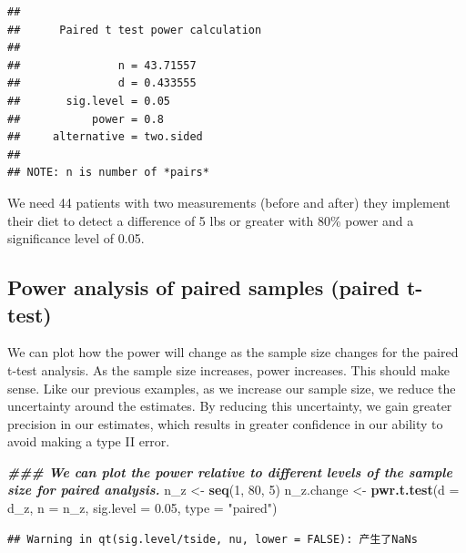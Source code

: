 \documentclass[
]{book}
\newenvironment{Shaded}{\begin{snugshade}}{\end{snugshade}}
\newcommand{\AttributeTok}[1]{\textcolor[rgb]{0.13,0.29,0.53}{#1}}
\newcommand{\DecValTok}[1]{\textcolor[rgb]{0.00,0.00,0.81}{#1}}
\newcommand{\DocumentationTok}[1]{\textcolor[rgb]{0.56,0.35,0.01}{\textbf{\textit{#1}}}}
\newcommand{\FloatTok}[1]{\textcolor[rgb]{0.00,0.00,0.81}{#1}}
\newcommand{\FunctionTok}[1]{\textcolor[rgb]{0.13,0.29,0.53}{\textbf{#1}}}
\newcommand{\NormalTok}[1]{#1}
\newcommand{\OtherTok}[1]{\textcolor[rgb]{0.56,0.35,0.01}{#1}}
\newcommand{\SpecialCharTok}[1]{\textcolor[rgb]{0.81,0.36,0.00}{\textbf{#1}}}
\newcommand{\StringTok}[1]{\textcolor[rgb]{0.31,0.60,0.02}{#1}}
\begin{document}
\begin{verbatim}
## 
##      Paired t test power calculation 
## 
##               n = 43.71557
##               d = 0.433555
##       sig.level = 0.05
##           power = 0.8
##     alternative = two.sided
## 
## NOTE: n is number of *pairs*
\end{verbatim}

We need 44 patients with two measurements (before and after) they implement their diet to detect a difference of 5 lbs or greater with 80\% power and a significance level of 0.05.

\hypertarget{power-analysis-of-paired-samples-paired-t-test}{%
\subsection{\texorpdfstring{Power analysis of \textbf{paired samples (paired t-test)}}{Power analysis of paired samples (paired t-test)}}\label{power-analysis-of-paired-samples-paired-t-test}}

We can plot how the power will change as the sample size changes for the paired t-test analysis. As the sample size increases, power increases. This should make sense. Like our previous examples, as we increase our sample size, we reduce the uncertainty around the estimates. By reducing this uncertainty, we gain greater precision in our estimates, which results in greater confidence in our ability to avoid making a type II error.

\begin{Shaded}
\begin{Highlighting}[]
\DocumentationTok{\#\#\# We can plot the power relative to different levels of the sample size for paired analysis. }
\NormalTok{n\_z }\OtherTok{\textless{}{-}} \FunctionTok{seq}\NormalTok{(}\DecValTok{1}\NormalTok{, }\DecValTok{80}\NormalTok{, }\DecValTok{5}\NormalTok{)}
\NormalTok{n\_z.change }\OtherTok{\textless{}{-}} \FunctionTok{pwr.t.test}\NormalTok{(}\AttributeTok{d =}\NormalTok{ d\_z, }\AttributeTok{n =}\NormalTok{ n\_z, }\AttributeTok{sig.level =} \FloatTok{0.05}\NormalTok{, }\AttributeTok{type =} \StringTok{"paired"}\NormalTok{)}
\end{Highlighting}
\end{Shaded}

\begin{verbatim}
## Warning in qt(sig.level/tside, nu, lower = FALSE): 产生了NaNs
\end{verbatim}

\begin{Shaded}
\end{Shaded}
\end{document}
